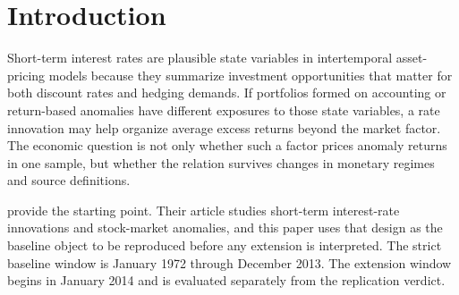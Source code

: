 \documentclass[11pt]{article}
\begin{document}
\begin{abstract}
albeit on richer factor sets. The post-2013 point estimates fail the registered %
compatibility gates, reversing sign for five of seven anomaly families. That
failure is not explained by the measured data-vintage contribution, and the
registered exposure-dispersion gate continues to pass; substantial
beta-estimation uncertainty nevertheless prevents reading it as proof that the
underlying pricing relation changed, and four of the five reversals are of signs
the baseline never established. Rate exposures are
regime dependent under a pooled interaction test, while regime-specific
differences in the price of risk cannot be identified at feasible regime lengths.
A registered out-of-sample falsification, refitting annually from a frozen
1999-12 training endpoint, returns a cross-sectional out-of-sample $R^2$ of %
0.0039 against a historical-mean benchmark: the model beats a zero-return rule %
comfortably and the historical mean by a margin too small to be economically
interesting.
A calibrated simulation points to what these share: estimated rate betas have a
reliability ratio of 0.386 even in the full sample, so most of their %
cross-sectional dispersion is estimation error, and the nominal Shanken interval
stated coverage at no simulated sample size.
\end{abstract}

\section{Introduction}

Short-term interest rates are plausible state variables in intertemporal
asset-pricing models because they summarize investment opportunities that matter
for both discount rates and hedging demands. If portfolios formed on accounting
or return-based anomalies have different exposures to those state variables, a
rate innovation may help organize average excess returns beyond the market
factor. The economic question is not only whether such a factor prices anomaly
returns in one sample, but whether the relation survives changes in monetary
regimes and source definitions.

\citet{maio_santaclara_2017} provide the starting point. Their article studies
short-term interest-rate innovations and stock-market anomalies, and this paper
uses that design as the baseline object to be reproduced before any extension is
interpreted. The strict baseline window is January 1972 through December 2013. %
The extension window begins in January 2014 and is evaluated separately from the replication verdict. %
\end{document}
